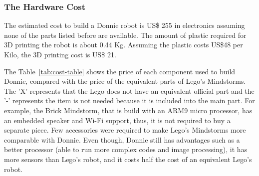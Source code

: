 
\subsubsection{The Hardware Cost}
\label{sec:hw-cost}

The estimated cost to build a Donnie robot is US\$ 255 in electronics assuming none of the parts listed before are available. The amount of plastic required for 3D printing the robot is about 0.44 Kg. Assuming the plastic costs US\$48 per Kilo, the 3D printing cost is US\$ 21. 

The Table~\ref{tab:cost-table} shows the price of each component used to build Donnie, compared with the price of the equivalent parts of Lego's Mindstorms. The 'X' represents that the Lego does not have an equivalent official part and the '-' represents the item is not needed because it is included into the main part. For example, the Brick Mindstorm, that is build with an ARM9 micro processor, has an embedded speaker and Wi-Fi support, thus, it is not required to buy a separate piece. 
Few accessories were required to make Lego's Mindstorms more comparable with Donnie. Even though, Donnie still has advantages such as a better processor (able to run more complex codes and image processing), it has more sensors than Lego's robot, and it costs half the cost of an equivalent Lego's robot. 


